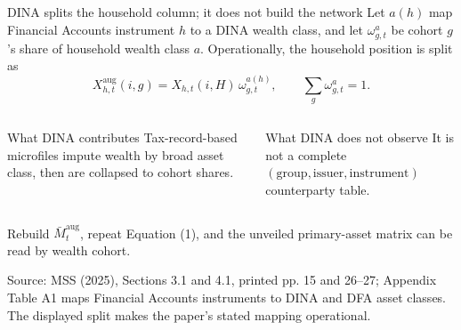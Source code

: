 \documentclass[aspectratio=169,11pt]{beamer}
\newcommand{\source}[1]{%
  \vfill
  {\color{MSSGray}\fontsize{6.5}{7.5}\selectfont #1\par}
}
\begin{document}
\begin{frame}{DINA splits the household column; it does not build the network}
  \fontsize{8.8}{10.5}\selectfont
  Let \(a(h)\) map Financial Accounts instrument \(h\) to a DINA wealth class,
  and let \(\omega_{g,t}^{a}\) be cohort \(g\)'s share of household wealth class
  \(a\). Operationally, the household position is split as
  \[
    \boxed{
      X^{\mathrm{aug}}_{h,t}(i,g)
      =X_{h,t}(i,H)\,\omega_{g,t}^{a(h)},
      \qquad \sum_g\omega_{g,t}^{a}=1
    }.
  \]
  \begin{columns}[T,onlytextwidth]
    \centering

    \begin{block}{What DINA contributes}
      Tax-record-based microfiles impute wealth by broad asset class, then are
      collapsed to cohort shares.
    \end{block}
    \begin{alertblock}{What DINA does not observe}
      It is not a complete
      \((\text{group},\text{issuer},\text{instrument})\) counterparty table.
    \end{alertblock}
  \end{columns}
  Rebuild \(\bar M_t^{\mathrm{aug}}\), repeat Equation (1), and the unveiled
  primary-asset matrix can be read by wealth cohort.
  \source{Source: MSS (2025), Sections 3.1 and 4.1, printed pp. 15 and 26--27; Appendix Table A1 maps Financial Accounts instruments to DINA and DFA asset classes. The displayed split makes the paper's stated mapping operational.}
\end{frame}
\end{document}
